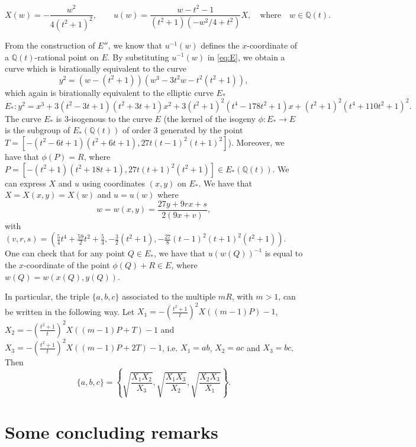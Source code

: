 \documentclass[11pt]{amsart}
\theoremstyle{plain}
\theoremstyle{remark}
\begin{document}
\[
X(w)=-\frac{w^2}{4(t^2+1)^2},\qquad u(w)=\frac{w-t^2-1}{(t^2+1)(-w^2/4+t^2)}X, \quad \textrm{where}\quad w\in\mathbb{Q}(t).
\]

From the construction of $E''$, we know that $u^{-1}(w)$ defines the $x$-coordinate of a $\mathbb{Q}(t)$-rational point on $E$. By substituting $u^{-1}(w)$ in \eqref{eq:E}, we obtain a curve which is birationally equivalent to the curve
\[
y^2=(w-(t^2+1))(w^3-3t^2w-t^2(t^2+1)),
\]
which again is birationally equivalent to the elliptic curve $E_{*}$
\begin{equation}\label{eq:E_}
E_{*}: y^2 = x^3 + 3(t^2-3t+1)(t^2+3t+1)x^2+3(t^2+1)^2(t^4-178t^2+1)x+(t^2+1)^2(t^4+110t^2+1)^2.
\end{equation}
The curve $E_{*}$ is $3$-isogenous to the curve $E$ (the kernel of the isogeny $\phi:E_{*} \rightarrow E$ is the subgroup of $E_{*}(\mathbb{Q}(t))$ of order $3$ generated by the point $T=[-(t^2-6t+1)(t^2+6t+1),27t(t-1)^2(t+1)^2 ]$). Moreover, we have that $\phi(P)=R$, where $P=[-(t^2+1)(t^2+18t+1), 27t(t+1)^2(t^2+1)]\in E_{*}(\mathbb{Q}(t))$. We can express $X$ and $u$ using coordinates $(x,y)$ on $E_{*}$. We have that $X=X(x,y)=X(w)$ and $u=u(w)$ where
$$w=w(x,y)=\frac{27y+9rx+s}{2(9x+v)},$$ with $(v,r,s)=\left(\frac{5}{4} t^4 + \frac{59}{2}t^2 + \frac{5}{4}, -\frac{3}{2}( t^2 + 1), -\frac{27}{8}(t-1)^2(t+1)^2(t^2+1)\right).$ One can check that for any point $Q\in E_{*}$, we have that
$u(w(Q))^{-1}$ is equal to the $x$-coordinate of the point $\phi(Q)+R\in E$, where $w(Q)=w\left(x(Q),y(Q)\right)$.

In particular, the triple $\{a, b, c\}$ associated to the multiple $mR$, with $m>1$, can be written in the following way. Let $X_1=-\left(\frac{t^2+1}{t}\right)^2 X((m-1)P)-1$, $X_2=-\left(\frac{t^2+1}{t}\right)^2 X((m-1)P+T)-1$ and $X_3=-\left(\frac{t^2+1}{t}\right)^2X((m-1)P+2T)-1$, i.e. $X_1=ab$, $X_2=ac$ and $X_3=bc$. Then
\[
\{a, b, c \}=\left\{ \sqrt{\frac{X_1 X_2}{X_3}}, \sqrt{\frac{X_1 X_3}{X_2}}, \sqrt{\frac{X_2 X_3}{X_1}}\right\}.
\]


\section{Some concluding remarks}  \label{sec6}
\end{document}
